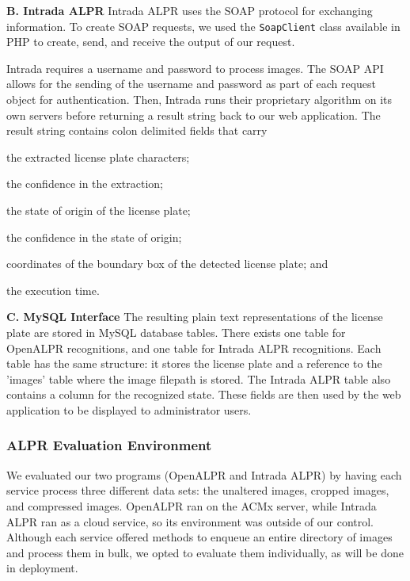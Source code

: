 \documentclass[11pt, oneside, fullpage, doublespace]{article}
\begin{document}
\textbf{B. Intrada ALPR}
Intrada ALPR uses the SOAP protocol for exchanging information. To create SOAP requests, we used the \verb+SoapClient+ class available in PHP to create, send, and receive the output of our request.

Intrada requires a username and password to process images. The SOAP API allows for the sending of the username and password as part of each request object for authentication. Then, Intrada runs their proprietary algorithm on its own servers before returning a result string back to our web application. The result string contains colon delimited fields that carry 
\begin{inparaenum}
\item the extracted license plate characters;
\item the confidence in the extraction;
\item the state of origin of the license plate;
\item the confidence in the state of origin;
\item coordinates of the boundary box of the detected license plate; and
\item the execution time.
\end{inparaenum}

\textbf{C. MySQL Interface}
The resulting plain text representations of the license plate are stored in MySQL database tables. There exists one table for OpenALPR recognitions, and one table for Intrada ALPR recognitions. Each table has the same structure: it stores the license plate and a reference to the 'images' table where the image filepath is stored. The Intrada ALPR table also contains a column for the recognized state. These fields are then used by the web application to be displayed to administrator users.

\subsubsection{ALPR Evaluation Environment}
We evaluated our two programs (OpenALPR and Intrada ALPR) by having each service process three different data sets: the unaltered images, cropped images, and compressed images. OpenALPR ran on the ACMx server, while Intrada ALPR ran as a cloud service, so its environment was outside of our control. Although each service offered methods to enqueue an entire directory of images and process them in bulk, we opted to evaluate them individually, as will be done in deployment.
\end{document}
